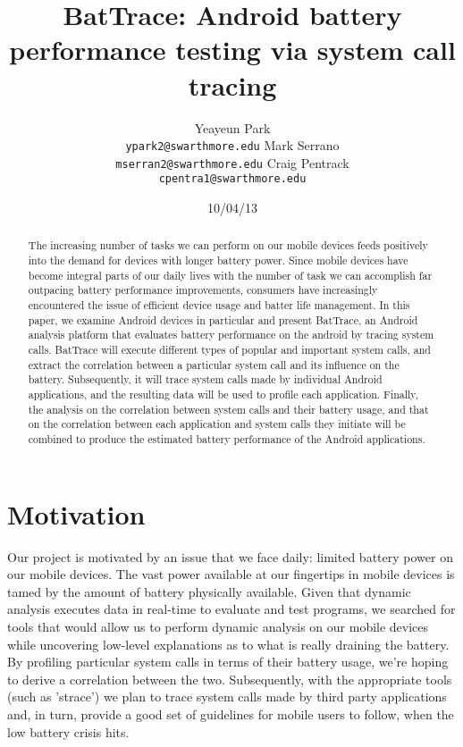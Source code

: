 \documentclass[11pt]{article}
\title{BatTrace: Android battery performance testing via system call tracing}
\author{Yeayeun Park\\
  {\tt ypark2@swarthmore.edu}  
  \And                           
  Mark Serrano\\
  {\tt mserran2@swarthmore.edu}
  \And                            
  Craig Pentrack\\                 
  {\tt cpentra1@swarthmore.edu}}
\date{10/04/13}
\begin{document}
\maketitle
\begin{abstract}
  The increasing number of tasks we can perform on our mobile devices 
  feeds positively into the demand for devices with longer battery power. 
  Since mobile devices have become integral parts of our daily lives with
  the number of task we can accomplish far outpacing battery performance 
  improvements, consumers have increasingly encountered the issue of 
  efficient device usage and batter life management. In this paper, we 
  examine Android devices in particular and present BatTrace, an Android 
  analysis platform that evaluates battery performance on the android by tracing system calls. BatTrace will execute 
  different types of popular and important system calls, and extract the 
  correlation between a particular system call and its influence on the 
  battery. Subsequently, it will trace system calls made by individual Android 
  applications, and the resulting data will be used to profile each application. 
  Finally, the analysis on the correlation between system calls and their 
  battery usage, and that on the correlation between each application and system 
  calls they initiate will be combined to produce the estimated battery performance 
  of the Android applications.
\end{abstract}

\section{Motivation}

Our project is motivated by an issue that we face daily: limited battery power 
on our mobile devices. The vast power available at our fingertips in mobile
devices is tamed by the amount of battery physically available. Given 
that dynamic analysis executes data in real-time to evaluate and test programs, 
we searched for tools that would allow us to perform dynamic analysis on our 
mobile devices while uncovering low-level explanations as to what is really 
draining the battery. By profiling particular system calls in terms of their battery
usage, we're hoping to derive a correlation between the two. Subsequently, with the
appropriate tools (such as 'strace') we plan to trace system calls made by third 
party applications and, in turn, provide a good set of guidelines for mobile users 
to follow, when the low battery crisis hits.
\end{document}
